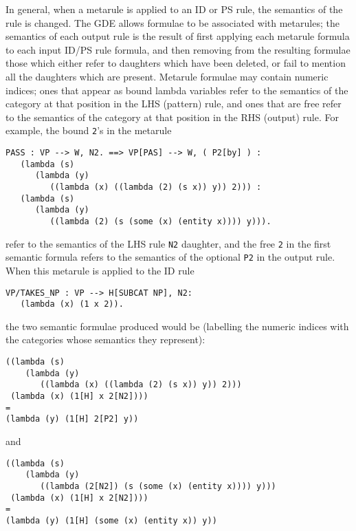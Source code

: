 In general, when a metarule is applied to an ID or PS rule, the
semantics of the rule is changed. The GDE allows formulae to be
associated with metarules; the semantics of each output rule is the
result of first applying each metarule formula to each input ID/PS rule
formula, and then removing from the resulting formulae those which either
refer to daughters which have been deleted, or fail to mention all the
daughters which are present. Metarule formulae may contain numeric
indices; ones that appear as bound lambda variables refer to the
semantics of the category at that position in the LHS (pattern) rule,
and ones that are free refer to the semantics of the category at that
position in the RHS (output) rule.  For example, the bound {\tt 2}'s in the
metarule
\begin{ex}
\begin{verbatim}
PASS : VP --> W, N2. ==> VP[PAS] --> W, ( P2[by] ) :
   (lambda (s)
      (lambda (y)
         ((lambda (x) ((lambda (2) (s x)) y)) 2))) : 
   (lambda (s)
      (lambda (y)
         ((lambda (2) (s (some (x) (entity x)))) y))).
\end{verbatim}
\end{ex}
refer to the semantics of the LHS rule {\tt N2} daughter, and the
free {\tt 2} in the first semantic formula refers to the semantics of the
optional {\tt P2} in the output rule. When this metarule is applied to
the ID rule
\begin{ex}
\begin{verbatim}
VP/TAKES_NP : VP --> H[SUBCAT NP], N2:
   (lambda (x) (1 x 2)).
\end{verbatim}
\end{ex}
the two semantic formulae produced would be (labelling the numeric
indices with the categories whose semantics they represent):
\begin{ex}
\begin{verbatim}
((lambda (s)
    (lambda (y)
       ((lambda (x) ((lambda (2) (s x)) y)) 2)))
 (lambda (x) (1[H] x 2[N2]))) 
=
(lambda (y) (1[H] 2[P2] y))
\end{verbatim}
\end{ex}
and
\begin{ex}
\begin{verbatim}
((lambda (s)
    (lambda (y)
       ((lambda (2[N2]) (s (some (x) (entity x)))) y)))
 (lambda (x) (1[H] x 2[N2]))) 
=
(lambda (y) (1[H] (some (x) (entity x)) y))
\end{verbatim}
\end{ex}

